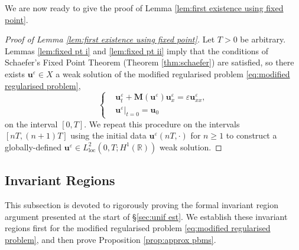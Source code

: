 \documentclass[11pt,a4paper,reqno]{amsart}
\numberwithin{equation}{section}
\theoremstyle{definition}
\theoremstyle{remark}
\newcommand{\bu}{\mathbf{u}}
\newcommand{\loc}{\mathrm{loc}}
\newcommand{\bM}{\mathbf{M}}
\renewcommand{\geq}{\geqslant}
\begin{document}
{We are now ready to give the proof of Lemma \ref{lem:first existence using fixed point}. 

\begin{proof}[Proof of Lemma \ref{lem:first existence using fixed point}]
    Let $T>0$ be arbitrary. Lemmas \ref{lem:fixed pt i} and \ref{lem:fixed pt ii} imply that the conditions of Schaefer's Fixed Point Theorem (Theorem \ref{thm:schaefer}) are satisfied, so there exists $\bu^\varepsilon \in X$ a weak solution of the modified regularised problem \eqref{eq:modified regularised problem}, 
\begin{equation*}
    \left\lbrace \begin{aligned}
        &\bu^\varepsilon_t + \bM(\bu^\varepsilon) \bu^\varepsilon_x = \varepsilon \bu^\varepsilon_{xx}, \\ 
        &\bu^\varepsilon|_{t=0} = \bu_0 
    \end{aligned} \right. 
\end{equation*}
on the interval $[0,T]$. We repeat this procedure on the intervals $[nT,(n+1)T]$ using the initial data $\bu^\varepsilon(nT,\cdot)$ for $n \geq 1$ to construct a globally-defined $\bu^\varepsilon \in L^2_{\loc}(0,T;H^1(\mathbb{R}))$ weak solution. 
\end{proof}


\subsection{Invariant Regions}
This subsection is devoted to rigorously proving the formal invariant region argument presented at the start of \S \ref{sec:unif est}. We establish these invariant regions first for the modified regularised problem \eqref{eq:modified regularised problem}, and then prove Proposition \ref{prop:approx pbms}. 


}
\end{document}
